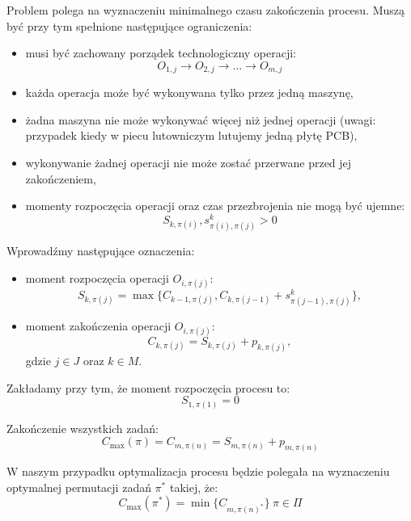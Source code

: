 Problem polega na wyznaczeniu minimalnego czasu zakończenia procesu. Muszą być przy tym spełnione następujące ograniczenia:
\begin{itemize}
	\item musi być zachowany porządek technologiczny operacji:
		  \begin{equation}
			  O_{1, j} \rightarrow O_{2, j} \rightarrow \dots \rightarrow O_{m, j}
		  \end{equation}
	\item każda operacja może być wykonywana tylko przez jedną maszynę,
	\item żadna maszyna nie może wykonywać więcej niż jednej operacji (uwagi: przypadek kiedy w piecu lutowniczym lutujemy jedną płytę PCB),
	\item wykonywanie żadnej operacji nie może zostać przerwane przed jej zakończeniem,
	\item momenty rozpoczęcia operacji oraz czas przezbrojenia nie mogą być ujemne:
		  \begin{equation}
			  S_{k, \pi(i)}, s^{k}_{\pi(i), \pi(j)} > 0
		  \end{equation}
\end{itemize}

Wprowadźmy następujące oznaczenia:
\begin{itemize}
	\item
	moment rozpoczęcia operacji $O_{i,\pi(j)}$:
	\begin{equation}
		S_{k, \pi(j)}=\max\{C_{k-1, \pi(j)}, C_{k, \pi(j-1)}+s^k_{\pi(j-1), \pi(j)}\},
	\end{equation}
	\item
	moment zakończenia operacji $O_{i,\pi(j)}$:
	\begin{equation}
		C_{k, \pi(j)} = S_{k, \pi(j)} + p_{k, \pi(j)},
	\end{equation}
	gdzie $ j \in J$ oraz $k \in M$.
\end{itemize}


\breakparagraph{}
Zakładamy przy tym, że moment rozpoczęcia procesu to:
\begin{equation}
	S_{1, \pi(1)}=0
\end{equation}

\breakparagraph{}
Zakończenie wszystkich zadań:
\begin{equation}
	C_{\max}(\pi) = 	C_{m, \pi(n)} = S_{m, \pi(n)} + p_{m, \pi(n)}
\end{equation}

\breakparagraph{}
W naszym przypadku optymalizacja procesu będzie polegała na wyznaczeniu optymalnej permutacji zadań $\pi^*$ takiej, że:
\begin{equation}
	C_{\max}(\pi^{*}) = \min\{C_{m, \pi{(n)}^{*}}\} \ \pi \in \Pi
\end{equation}
